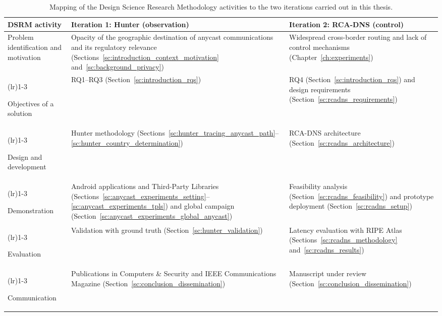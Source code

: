 \documentclass[
A4paper,                %
twoside,                %
openright,              %
chapterprefix=true,     %
12pt,                   %
headings=normal,        %
titlepage=on            %
]{book}
\newcommand{\rowsep}[1]{%
    \arrayrulecolor{black!30}%
    \cmidrule[0.3pt](lr){1-#1}%
    \arrayrulecolor{black}%
}
\begin{document}
\begin{table}[ht]
    \centering
    \small
    \caption{Mapping of the Design Science Research Methodology activities \cite{Peffers2007AResearch} to the two iterations carried out in this thesis.}
    \label{tab:introduction_dsr_mapping}
    \begin{tabularx}{\textwidth}{>{\raggedright\arraybackslash}p{2.9cm} >{\raggedright\arraybackslash}X >{\raggedright\arraybackslash}X}
        \toprule
        \textbf{DSRM activity} & \textbf{Iteration 1: Hunter (observation)} & \textbf{Iteration 2: RCA-DNS (control)} \\
        \midrule
        Problem identification and motivation & Opacity of the geographic destination of anycast communications and its regulatory relevance (Sections~\ref{sc:introduction_context_motivation} and~\ref{sc:background_privacy}) & Widespread cross-border routing and lack of control mechanisms (Chapter~\ref{ch:experiments}) \\
        \rowsep{3}
        Objectives of a solution & RQ1--RQ3 (Section~\ref{sc:introduction_rqs}) & RQ4 (Section~\ref{sc:introduction_rqs}) and design requirements (Section~\ref{sc:rcadns_requirements}) \\
        \rowsep{3}
        Design and development & Hunter methodology (Sections~\ref{sc:hunter_tracing_anycast_path}--\ref{sc:hunter_country_determination}) & RCA-DNS architecture (Section~\ref{sc:rcadns_architecture}) \\
        \rowsep{3}
        Demonstration & Android applications and Third-Party Libraries (Sections~\ref{sc:anycast_experiments_setting}--\ref{sc:anycast_experiments_tpls}) and global campaign (Section~\ref{sc:anycast_experiments_global_anycast}) & Feasibility analysis (Section~\ref{sc:rcadns_feasibility}) and prototype deployment (Section~\ref{sc:rcadns_setup}) \\
        \rowsep{3}
        Evaluation & Validation with ground truth (Section~\ref{sc:hunter_validation}) & Latency evaluation with RIPE Atlas (Sections~\ref{sc:rcadns_methodology} and~\ref{sc:rcadns_results}) \\
        \rowsep{3}
        Communication & Publications in Computers \& Security and IEEE Communications Magazine (Section~\ref{sc:conclusion_dissemination}) & Manuscript under review (Section~\ref{sc:conclusion_dissemination}) \\
        \bottomrule
    \end{tabularx}
\end{table}
\end{document}
